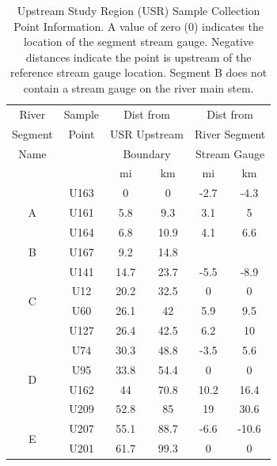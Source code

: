 \begin{table}[htbp]
	\centering
	\caption[Upstream Study Region (USR) Sample Collection Point Information.]{Upstream Study Region (USR) Sample Collection Point Information.  A value of zero (0) indicates the location of the segment stream gauge.  Negative distances indicate the point is upstream of the reference stream gauge location. Segment B does not contain a stream gauge on the river main stem.}
	\label{tab:USRSampleLoc}
	\begin{tabular}{cccccc}
		\toprule
		River                       & Sample &  \multicolumn{2}{c}{Dist from}   &   \multicolumn{2}{c}{Dist from}   \\
		Segment                      & Point  & \multicolumn{2}{c}{USR Upstream} & \multicolumn{2}{c}{River Segment} \\
		Name                        &        &   \multicolumn{2}{c}{Boundary}   & \multicolumn{2}{c}{Stream Gauge}  \\
		\cmidrule(r{.5em}l){3-4} \cmidrule(r{.5em}l){5-6} &        &  mi  &            km             &  mi  &             km             \\ \toprule
		\multirow{3}{*}{A}                 &  U163  &  0   &             0             & -2.7 &            -4.3            \\
		&  U161  & 5.8  &            9.3            & 3.1  &             5              \\
		&  U164  & 6.8  &           10.9            & 4.1  &            6.6             \\ \midrule
		B                         &  U167  & 9.2  &           14.8            &      &  \\ \midrule
		\multirow{4}{*}{C}                 &  U141  & 14.7 &           23.7            & -5.5 &            -8.9            \\
		&  U12   & 20.2 &           32.5            &  0   &             0              \\
		&  U60   & 26.1 &            42             & 5.9  &            9.5             \\
		&  U127  & 26.4 &           42.5            & 6.2  &             10             \\ \midrule
		\multirow{4}{*}{D}                 &  U74   & 30.3 &           48.8            & -3.5 &            5.6             \\
		&  U95   & 33.8 &           54.4            &  0   &             0              \\
		&  U162  &  44  &           70.8            & 10.2 &            16.4            \\
		&  U209  & 52.8 &            85             &  19  &            30.6            \\ \midrule
		\multirow{2}{*}{E}                 &  U207  & 55.1 &           88.7            & -6.6 &           -10.6            \\
		&  U201  & 61.7 &           99.3            &  0   &             0              \\ \bottomrule
	\end{tabular}
\end{table}

